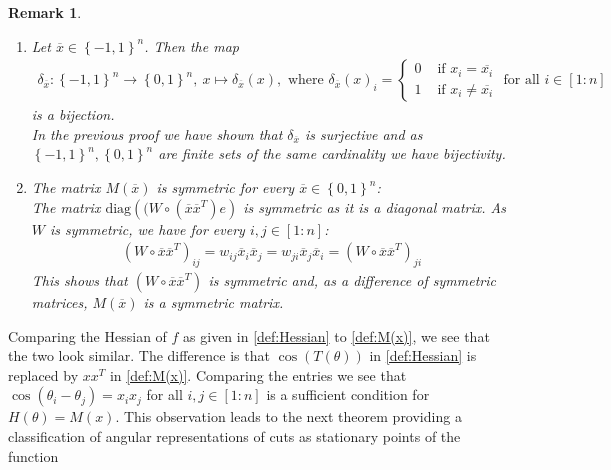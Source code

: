 \documentclass[12pt,a4paper]{article}
\theoremstyle{mythm}
\newtheorem*{rem}{Remark}
\begin{document}
\begin{rem}
\begin{enumerate}
\item 
Let $ \overline{ x } \in \left\{ -1,1 \right\} ^{ n }  $.
Then the map
\begin{align*}
\delta _{ \overline{ x }  }  : \left\{ -1,1 \right\} ^{ n }  \to \left\{ 0,1 \right\} ^{ n }  , \ x \mapsto \delta _{ \overline{ x }  } ( x ), \text{ where }   \delta _{ \overline{ x
} } (x)  _{ i } = \begin{cases}
0 & \text{ if } x_i = \overline{ x_i } \\
1 & \text{ if } x_i \neq \overline{ x_i }  
\end{cases}
\text{ for all } i \in \left[ 1:n \right]   
\end{align*} 
is a bijection. \\
In the previous proof we have shown that $ \delta _{ \overline{ x }  }  $ is surjective and as $ \left\{ -1,1 \right\} ^{ n } , \left\{ 0,1 \right\} ^{ n }  $ are finite sets
of the same cardinality we have bijectivity.
\item The matrix $ M ( \overline{ x } ) $ is symmetric for every $ \overline{ x } \in \left\{ 0,1 \right\} ^{ n }  $: \\
The matrix $ \text{diag} \left( ( W \circ \left( \overline{ x } \overline{ x } ^T  \right) e  \right)  $ is symmetric as it is a diagonal matrix.
As $ W $ is symmetric, we have for every $ i,j \in \left[ 1:n \right]  $:
\begin{align*}
\left( W \circ \overline{ x } \overline{ x } ^T	 \right) _{ ij } = w _{ ij } \overline{ x } _{ i } \overline{ x } _{ j } = w _{ ji } \overline{ x } _{ j } \overline{ x } _{ i
} = \left( W \circ \overline{ x } \overline{ x } ^T  \right) _{ ji } 
\end{align*} 
This shows that $ \left( W \circ \overline{ x } \overline{ x } ^T  \right)  $ is symmetric and, as a difference of symmetric matrices, $ M ( \overline{ x } )  $ is a symmetric
matrix.
\end{enumerate}
\end{rem} 
Comparing the Hessian of $ f $ as given in \ref{def:Hessian} to \ref{def:M(x)}, we see that the two look similar. 
The difference is that $ \cos( T(\theta) )  $ in \ref{def:Hessian} is replaced by $ x  x  ^T  $ in \ref{def:M(x)}. Comparing the entries we see that $
\cos( \theta_i - \theta_j ) = x_i x_j  $ for all $ i,j \in \left[ 1:n \right]  $ is a sufficient condition for $ H(\theta) = M(x) $.
This observation leads to the next theorem providing a classification of angular representations of cuts as stationary points of the function 
\end{document}
